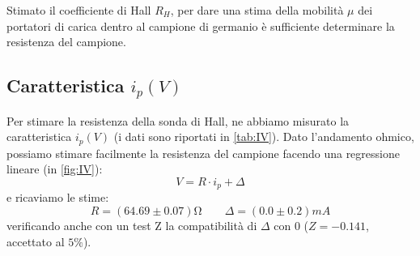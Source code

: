 
Stimato il coefficiente di Hall $ R_H $, per dare una stima della mobilità $ \mu $ dei portatori di carica dentro al campione di germanio è sufficiente determinare la resistenza del campione.

\subsection{Caratteristica $ i_p(V) $}

Per stimare la resistenza della sonda di Hall, ne abbiamo misurato la caratteristica $ i_p(V) $ (i dati sono riportati in \cref{tab:IV}).
Dato l'andamento ohmico, possiamo stimare facilmente la resistenza del campione facendo una regressione lineare (in \cref{fig:IV}):
\begin{equation}
V = R \cdot i_p + \Delta
\end{equation}
e ricaviamo le stime:
\begin{equation} \label{eq:resistance}
R = (64.69 \pm 0.07) \unit{\ohm} \qquad \Delta = (0.0 \pm 0.2) \unit{mA}
\end{equation}
verificando anche con un test Z la compatibilità di $ \Delta $ con $ 0 $ ($Z = -0.141$, accettato al $ 5 \% $).

